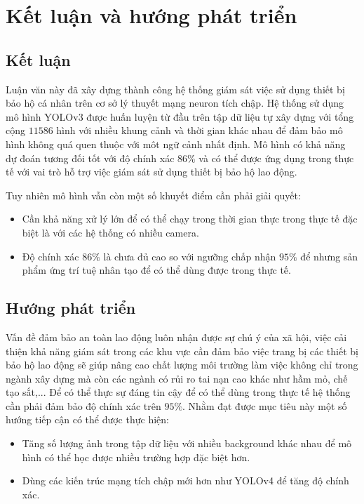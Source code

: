 \chapter{Kết luận và hướng phát triển}
\section{Kết luận}
Luận văn này đã xây dựng thành công hệ thống giám sát việc sử dụng thiết bị bảo hộ cá nhân trên cơ sở lý thuyết mạng neuron tích chập. Hệ thống sử dụng mô hình YOLOv3 được huấn luyện từ đầu trên tập dữ liệu tự xây dựng với tổng cộng $11586$ hình với nhiều khung cảnh và thời gian khác nhau để đảm bảo mô hình không quá quen thuộc với môt ngữ cảnh nhất định. Mô hình có khả năng dự đoán tương đối tốt với độ chính xác $86\%$ và có thể được ứng dụng trong thực tế với vai trò hỗ trợ việc giám sát sử dụng thiết bị bảo hộ lao động.

Tuy nhiên mô hình vẫn còn một số khuyết điểm cần phải giải quyết:
\begin{itemize}
	\item Cần khả năng xử lý lớn để có thể chạy trong thời gian thực trong thực tế đặc biệt là với các hệ thống có nhiều camera.
	\item Độ chính xác $86\%$ là chưa đủ cao so với ngưỡng chấp nhận $95\%$ để nhưng sản phẩm ứng trí tuệ nhân tạo để có thể dùng được trong thực tế.
\end{itemize}

\section{Hướng phát triển}
Vấn đề đảm bảo an toàn lao động luôn nhận được sự chú ý của xã hội, việc cải thiện khả năng giám sát trong các khu vực cần đảm bảo việc trang bị các thiết bị bảo hộ lao động sẽ giúp nâng cao chất lượng môi trường làm việc không chỉ trong ngành xây dựng mà còn các ngành có rủi ro tai nạn cao khác như hầm mỏ, chế tạo sắt,... Để có thể thực sự đáng tin cậy để có thể dùng trong thực tế hệ thống cần phải đảm bảo độ chính xác trên $95\%$. Nhằm đạt được mục tiêu này một số hướng tiếp cận có thể được thực hiện:
\begin{itemize}
	\item Tăng số lượng ảnh trong tập dữ liệu với nhiều background khác nhau để mô hình có thể học được nhiều trường hợp đặc biệt hơn.
	\item Dùng các kiến trúc mạng tích chập mới hơn như YOLOv4 để tăng độ chính xác.
\end{itemize}
